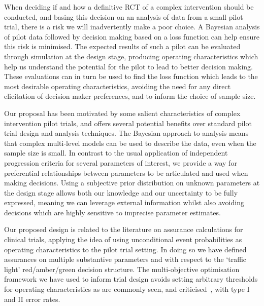 \documentclass[AMA,STIX1COL]{WileyNJD-v2}
\begin{document}
When deciding if and how a definitive RCT of a complex intervention should be conducted, and basing this decision on an analysis of data from a small pilot trial, there is a risk we will inadvertently make a poor choice. A Bayesian analysis of pilot data followed by decision making based on a loss function can help ensure this risk is minimised. The expected results of such a pilot can be evaluated through simulation at the design stage, producing operating characteristics which help us understand the potential for the pilot to lead to better decision making. These evaluations can in turn be used to find the loss function which leads to the most desirable operating characteristics, avoiding the need for any direct elicitation of decision maker preferences, and to inform the choice of sample size.

Our proposal has been motivated by some salient characteristics of complex intervention pilot trials, and offers several potential benefits over standard pilot trial design and analysis techniques. The Bayesian approach to analysis means that complex multi-level models can be used to describe the data, even when the sample size is small. In contrast to the usual application of independent progression criteria for several parameters of interest, we provide a way for preferential relationships between parameters to be articulated and used when making decisions. Using a subjective prior distribution on unknown parameters at the design stage allows both our knowledge and our uncertainty to be fully expressed, meaning we can leverage external  information whilst also avoiding decisions which are highly sensitive to imprecise parameter estimates.

Our proposed design is related to the literature on assurance calculations for clinical trials, applying the idea of using unconditional event probabilities as operating characteristics to the pilot trial setting. In doing so we have defined assurances on multiple substantive parameters and with respect to the `traffic light' red/amber/green decision structure. The multi-objective optimisation framework we have used to inform trial design avoids setting arbitrary thresholds for operating characteristics as are commonly seen, and criticised~\cite{Bacchetti2010}, with type I and II error rates.
\end{document}
